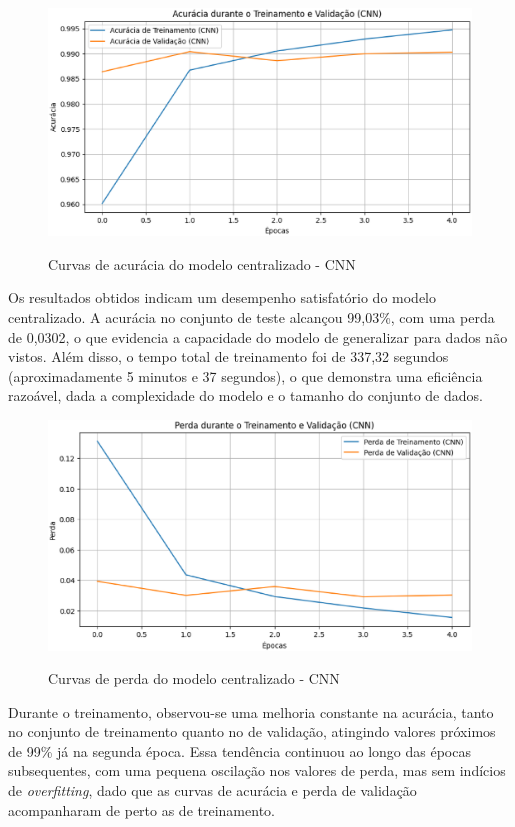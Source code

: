 \begin{figure}[ht]
    \centering
    \caption{Curvas de acurácia do modelo centralizado - CNN}
    \includegraphics[scale=0.4]{figuras/analiseResultados/acuracyCNN.eps}
    \label{fig:acuracyCNN}
\end{figure}

Os resultados obtidos indicam um desempenho satisfatório do modelo centralizado. A acurácia no conjunto de teste alcançou 99,03\%, com uma perda de 0,0302, o que evidencia a capacidade do modelo de generalizar para dados não vistos. Além disso, o tempo total de treinamento foi de 337,32 segundos (aproximadamente 5 minutos e 37 segundos), o que demonstra uma eficiência razoável, dada a complexidade do modelo e o tamanho do conjunto de dados.

\begin{figure}[ht]
    \centering
    \caption{Curvas de perda do modelo centralizado - CNN}
    \includegraphics[scale=0.4]{figuras/analiseResultados/lossCNN.eps}
    \label{fig:lossCNN}
\end{figure}

Durante o treinamento, observou-se uma melhoria constante na acurácia, tanto no conjunto de treinamento quanto no de validação, atingindo valores próximos de 99\% já na segunda época. Essa tendência continuou ao longo das épocas subsequentes, com uma pequena oscilação nos valores de perda, mas sem indícios de \textit{overfitting}, dado que as curvas de acurácia e perda de validação acompanharam de perto as de treinamento.

